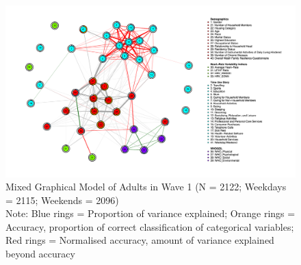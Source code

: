 \documentclass[11pt]{article}
\begin{document}
\begin{figure}[h]
  \centering
  \includegraphics[width=1\textwidth]{figure.pdf}
  \caption{Mixed Graphical Model of Adults in Wave 1 (N = 2122; Weekdays = 2115; Weekends = 2096) \\
  Note: Blue rings = Proportion of variance explained; Orange rings = Accuracy, proportion of correct classification of categorical variables; Red rings = Normalised accuracy, amount of variance explained beyond accuracy
  }
\end{figure}
\end{document}
